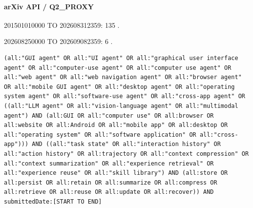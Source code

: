 \noindent\begin{minipage}{\linewidth}
\paragraph{arXiv API / Q2\_PROXY}
\par 201501010000 TO 202608312359: 135 .
\par 202608250000 TO 202609082359: 6 .
\begin{lstlisting}
(all:"GUI agent" OR all:"UI agent" OR all:"graphical user interface agent" OR all:"computer-use agent" OR all:"computer use agent" OR all:"web agent" OR all:"web navigation agent" OR all:"browser agent" OR all:"mobile GUI agent" OR all:"desktop agent" OR all:"operating system agent" OR all:"software-use agent" OR all:"cross-app agent" OR ((all:"LLM agent" OR all:"vision-language agent" OR all:"multimodal agent") AND (all:GUI OR all:"computer use" OR all:browser OR all:website OR all:Android OR all:"mobile app" OR all:desktop OR all:"operating system" OR all:"software application" OR all:"cross-app"))) AND ((all:"task state" OR all:"interaction history" OR all:"action history" OR all:trajectory OR all:"context compression" OR all:"context summarization" OR all:"experience retrieval" OR all:"experience reuse" OR all:"skill library") AND (all:store OR all:persist OR all:retain OR all:summarize OR all:compress OR all:retrieve OR all:reuse OR all:update OR all:recover)) AND submittedDate:[START TO END]
\end{lstlisting}
\end{minipage}\par\medskip
